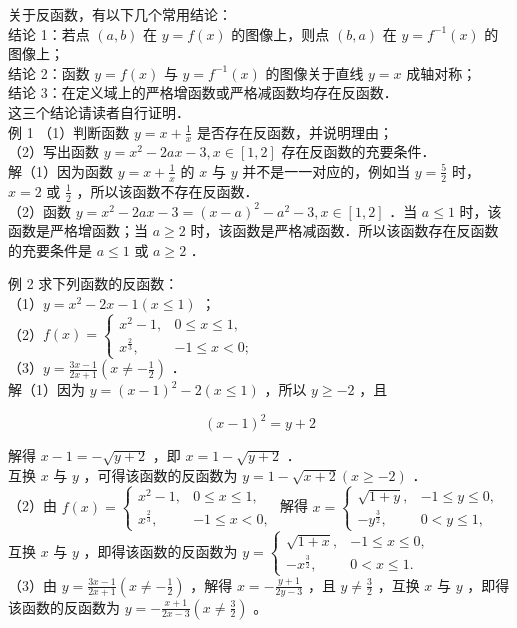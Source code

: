 \documentclass[10pt]{article}
\begin{document}
关于反函数，有以下几个常用结论：\\
结论 1：若点 \((a, b)\) 在 \(y=f(x)\) 的图像上，则点 \((b, a)\) 在 \(y=f^{-1}(x)\) 的图像上；\\
结论 2：函数 \(y=f(x)\) 与 \(y=f^{-1}(x)\) 的图像关于直线 \(y=x\) 成轴对称；\\
结论 3：在定义域上的严格增函数或严格减函数均存在反函数．\\
这三个结论请读者自行证明．\\
例 1 （1）判断函数 \(y=x+\frac{1}{x}\) 是否存在反函数，并说明理由；\\
（2）写出函数 \(y=x^{2}-2 a x-3, x \in[1,2]\) 存在反函数的充要条件．\\
解（1）因为函数 \(y=x+\frac{1}{x}\) 的 \(x\) 与 \(y\) 并不是一一对应的，例如当 \(y=\frac{5}{2}\) 时，\(x=2\) 或 \(\frac{1}{2}\) ，所以该函数不存在反函数．\\
（2）函数 \(y=x^{2}-2 a x-3=(x-a)^{2}-a^{2}-3, x \in[1,2]\) ．当 \(a \leqslant 1\) 时，该函数是严格增函数；当 \(a \geqslant 2\) 时，该函数是严格减函数．所以该函数存在反函数的充要条件是 \(a \leqslant 1\) 或 \(a \geqslant 2\) ．

例 2 求下列函数的反函数：\\
（1）\(y=x^{2}-2 x-1(x \leqslant 1)\) ；\\
（2）\(f(x)= \begin{cases}x^{2}-1, & 0 \leqslant x \leqslant 1, \\ x^{\frac{2}{3}}, & -1 \leqslant x<0 ;\end{cases}\)\\
（3）\(y=\frac{3 x-1}{2 x+1}\left(x \neq-\frac{1}{2}\right)\) ．\\
解（1）因为 \(y=(x-1)^{2}-2(x \leqslant 1)\) ，所以 \(y \geqslant-2\) ，且

\[
(x-1)^{2}=y+2
\]

解得 \(x-1=-\sqrt{y+2}\) ，即 \(x=1-\sqrt{y+2}\) ．\\
互换 \(x\) 与 \(y\) ，可得该函数的反函数为 \(y=1-\sqrt{x+2}(x \geqslant-2)\) ．\\
（2）由 \(f(x)=\left\{\begin{array}{ll}x^{2}-1, & 0 \leqslant x \leqslant 1, \\ x^{\frac{2}{3}}, & -1 \leqslant x<0,\end{array}\right.\) 解得 \(x=\left\{\begin{array}{ll}\sqrt{1+y}, & -1 \leqslant y \leqslant 0, \\ -y^{\frac{3}{2}}, & 0<y \leqslant 1,\end{array}\right.\) 互换 \(x\) 与 \(y\) ，即得该函数的反函数为 \(y= \begin{cases}\sqrt{1+x}, & -1 \leqslant x \leqslant 0, \\ -x^{\frac{3}{2}}, & 0<x \leqslant 1 .\end{cases}\)\\
（3）由 \(y=\frac{3 x-1}{2 x+1}\left(x \neq-\frac{1}{2}\right)\) ，解得 \(x=-\frac{y+1}{2 y-3}\) ，且 \(y \neq \frac{3}{2}\) ，互换 \(x\) 与 \(y\) ，即得该函数的反函数为 \(y=-\frac{x+1}{2 x-3}\left(x \neq \frac{3}{2}\right)\) 。
\end{document}
